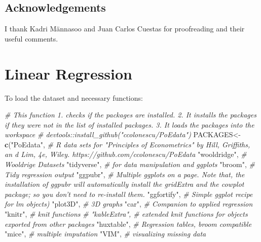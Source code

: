 \documentclass[]{book}
\newenvironment{Shaded}{\begin{snugshade}}{\end{snugshade}}
\newcommand{\CommentTok}[1]{\textcolor[rgb]{0.56,0.35,0.01}{\textit{#1}}}
\newcommand{\KeywordTok}[1]{\textcolor[rgb]{0.13,0.29,0.53}{\textbf{#1}}}
\newcommand{\NormalTok}[1]{#1}
\newcommand{\StringTok}[1]{\textcolor[rgb]{0.31,0.60,0.02}{#1}}
\begin{document}
\hypertarget{acknowledgements}{%
\section*{Acknowledgements}\label{acknowledgements}}

I thank Kadri Männasoo and Juan Carlos Cuestas for proofreading and
their useful comments.

\hypertarget{linearregression}{%
\chapter{Linear Regression}\label{linearregression}}

To load the dataset and necessary functions:

\begin{Shaded}
\begin{Highlighting}[]
\CommentTok{# This function 1. checks if the packages are installed. 2. It installs the packages if they were not in the list of installed packages. 3. It loads the packages into the workspace}
\CommentTok{# devtools::install_github("ccolonescu/PoEdata")}
\NormalTok{PACKAGES<-}\KeywordTok{c}\NormalTok{(}\StringTok{"PoEdata"}\NormalTok{, }\CommentTok{# R data sets for "Principles of Econometrics" by Hill, Griffiths, an d Lim, 4e, Wiley. https://github.com/ccolonescu/PoEdata}
            \StringTok{"wooldridge"}\NormalTok{,  }\CommentTok{# Wooldrige Datasets}
            \StringTok{"tidyverse"}\NormalTok{,  }\CommentTok{# for data manipulation and ggplots}
            \StringTok{"broom"}\NormalTok{,  }\CommentTok{# Tidy regression output}
            \StringTok{"ggpubr"}\NormalTok{,  }\CommentTok{# Multiple ggplots on a page. Note that, the installation of ggpubr will automatically install the gridExtra and the cowplot package; so you don’t need to re-install them. }
            \StringTok{"ggfortify"}\NormalTok{, }\CommentTok{# Simple ggplot recipe for lm objects) }
            \StringTok{"plot3D"}\NormalTok{,  }\CommentTok{#  3D graphs}
            \StringTok{"car"}\NormalTok{, }\CommentTok{# Companion to applied regression}
            \StringTok{"knitr"}\NormalTok{, }\CommentTok{# knit functions}
            \CommentTok{# "kableExtra", # extended knit functions for objects exported from other packages}
            \StringTok{"huxtable"}\NormalTok{, }\CommentTok{#  Regression tables, broom compatible}
            \StringTok{"mice"}\NormalTok{,  }\CommentTok{# multiple imputation}
            \StringTok{"VIM"}\NormalTok{, }\CommentTok{# visualizing missing data}

\end{Highlighting}
\end{Shaded}
\end{document}
